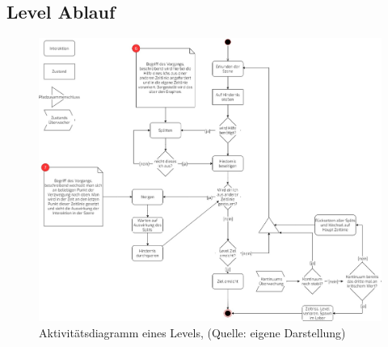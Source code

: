 \subsection{Level Ablauf}

\begin{figure}[ht]
\centering
\includegraphics[width=1\linewidth]{content/pictures/level_loop.jpg}
\caption{Aktivitätsdiagramm eines Levels, (Quelle: eigene Darstellung)}
\label{fig:level_loop}
\end{figure}

